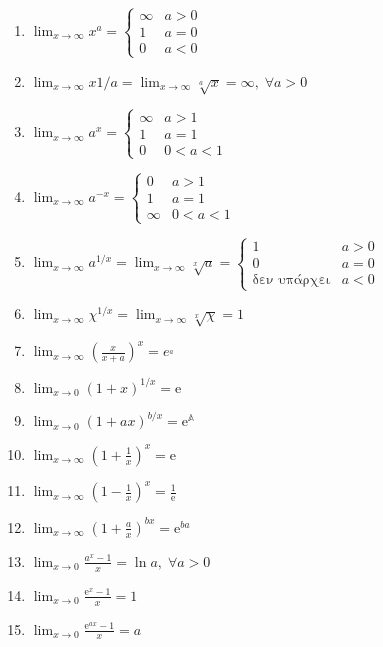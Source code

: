 \begin{enumerate}
  \item $ \lim_{x \to \infty} x^{a} = 
    \begin{cases}
      \infty & a>0 \\
      1 & a=0 \\
      0 & a<0
    \end{cases}$
  \item $ \lim_{x \to \infty} x{1/a} = \lim_{x \to \infty} \sqrt[a]{x} = \infty, \;
    \forall a >0 $
  \item $ \lim_{x \to \infty} a^{x} = 
    \begin{cases}
      \infty & a>1 \\
      1 & a=1 \\
      0 & 0<a<1
    \end{cases}$
  \item $ \lim_{x \to \infty} a^{-x} = 
    \begin{cases}
      0 & a>1 \\
      1 & a=1 \\
      \infty & 0<a<1
    \end{cases}$
  \item $ \lim_{x \to \infty} a^{1/x} = \lim_{x \to \infty} \sqrt[x]{a} = 
    \begin{cases}
      1 & a>0 \\
      0 & a=0 \\
      \text{δεν υπάρχει} & a<0
    \end{cases}$
  \item $ \lim_{x \to \infty} χ^{1/x} = \lim_{x \to \infty} \sqrt[x]{χ} = 1 $
  \item $ \lim_{x \to \infty} (\frac{x}{x+a})^{x} = e^{_a} $
  \item $ \lim_{x \to 0} (1+x)^{1/x} = \mathrm{e} $ 
  \item $ \lim_{x \to 0} (1+ax)^{b/x} = \mathrm{e}^{\mathbb{A}} $
  \item $ \lim_{x \to \infty} (1+ \frac{1}{x})^{x} = \mathrm{e} $
  \item $ \lim_{x \to \infty} (1- \frac{1}{x})^{x} = \frac{1}{\mathrm{e}} $
  \item $ \lim_{x \to \infty} (1+ \frac{a}{x})^{bx} = \mathrm{e}^{ba} $
  \item $ \lim_{x \to 0} \frac{a^{x}-1}{x} = \ln{a}, \; \forall a>0 $ 
  \item $ \lim_{x \to 0} \frac{\mathrm{e}^{x}-1}{x} = 1 $ 
  \item $ \lim_{x \to 0} \frac{\mathrm{e}^{ax}-1}{x} = a $ 

\end{enumerate}

